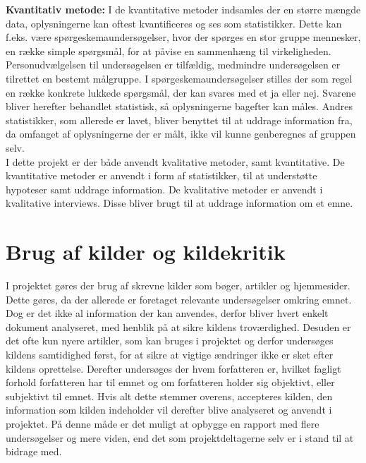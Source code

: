 \noindent\textbf{Kvantitativ metode:}
I de kvantitative metoder indsamles der en større mængde data, oplysningerne kan oftest kvantificeres og ses som statistikker. Dette kan f.eks. være spørgeskemaundersøgelser, hvor der spørges en stor gruppe mennesker, en række simple spørgsmål, for at påvise en sammenhæng til virkeligheden. Personudvælgelsen til undersøgelsen er tilfældig, medmindre undersøgelsen er tilrettet en bestemt målgruppe. I spørgeskemaundersøgelser stilles der som regel en række konkrete lukkede spørgsmål, der kan svares med et ja eller nej. Svarene bliver herefter behandlet statistisk, så oplysningerne bagefter kan måles. Andres statistikker, som allerede er lavet, bliver benyttet til at uddrage information fra, da omfanget af oplysningerne der er målt, ikke vil kunne genberegnes af gruppen selv.\citep{Kvan, Gymportalen}\\

\noindent I dette projekt er der både anvendt kvalitative metoder, samt kvantitative. De kvantitative metoder er anvendt i form af statistikker, til at understøtte hypoteser samt uddrage information. De kvalitative metoder er anvendt i kvalitative interviews. Disse bliver brugt til at uddrage information om et emne.

\section{Brug af kilder og kildekritik}
I projektet gøres der brug af skrevne kilder som bøger, artikler og hjemmesider. Dette gøres, da der allerede er foretaget relevante undersøgelser omkring emnet. Dog er det ikke al information der kan anvendes, derfor bliver hvert enkelt dokument analyseret, med henblik på at sikre kildens troværdighed. Desuden er det ofte kun nyere artikler, som kan bruges i projektet og derfor undersøges kildens samtidighed først, for at sikre at vigtige ændringer ikke er sket efter kildens oprettelse. Derefter undersøges der hvem forfatteren er, hvilket fagligt forhold forfatteren har til emnet og om forfatteren holder sig objektivt, eller subjektivt til emnet. Hvis alt dette stemmer overens, accepteres kilden, den information som kilden indeholder vil derefter blive analyseret og anvendt i projektet. På denne måde er det muligt at opbygge en rapport med flere undersøgelser og mere viden, end det som projektdeltagerne selv er i stand til at bidrage med.\citep{Kildekritik}

